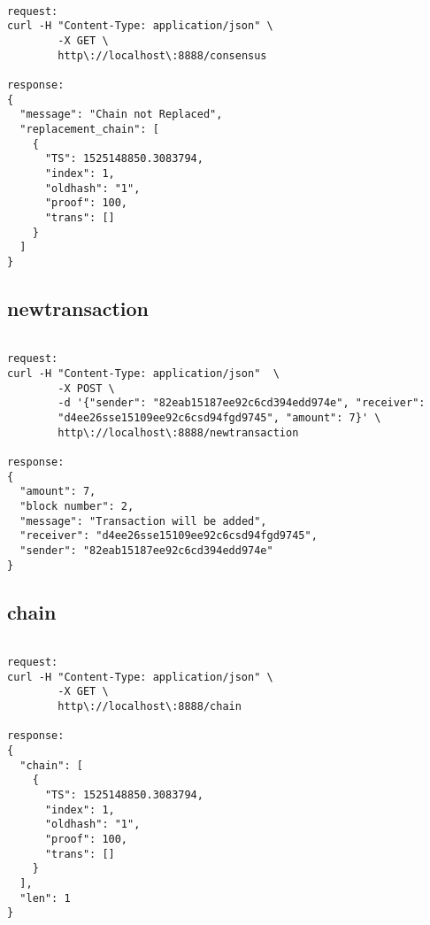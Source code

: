\bigskip
\noindent
\begin{footnotesize}
\begin{verbatim}

request:
curl -H "Content-Type: application/json" \
        -X GET \
        http\://localhost\:8888/consensus

response:
{
  "message": "Chain not Replaced",
  "replacement_chain": [
    {
      "TS": 1525148850.3083794,
      "index": 1,
      "oldhash": "1",
      "proof": 100,
      "trans": []
    }
  ]
}

\end{verbatim}
\end{footnotesize}

\subsection{newtransaction}

\bigskip
\noindent
\begin{footnotesize}
\begin{verbatim}

request:
curl -H "Content-Type: application/json"  \
        -X POST \
        -d '{"sender": "82eab15187ee92c6cd394edd974e", "receiver": 
        "d4ee26sse15109ee92c6csd94fgd9745", "amount": 7}' \
        http\://localhost\:8888/newtransaction

response:
{
  "amount": 7,
  "block number": 2,
  "message": "Transaction will be added",
  "receiver": "d4ee26sse15109ee92c6csd94fgd9745",
  "sender": "82eab15187ee92c6cd394edd974e"
}

\end{verbatim}
\end{footnotesize}

\subsection{chain}

\bigskip
\noindent
\begin{footnotesize}
\begin{verbatim}

request:
curl -H "Content-Type: application/json" \
        -X GET \
        http\://localhost\:8888/chain
        
response:
{
  "chain": [
    {
      "TS": 1525148850.3083794,
      "index": 1,
      "oldhash": "1",
      "proof": 100,
      "trans": []
    }
  ],
  "len": 1
}

\end{verbatim}
\end{footnotesize}

